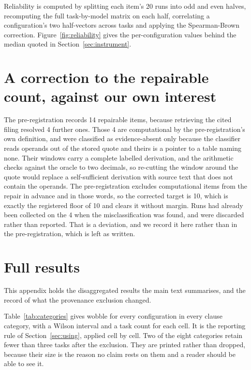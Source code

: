 \documentclass[11pt]{article}
\begin{document}
Reliability is
computed by splitting each item's 20 runs into odd and even halves, recomputing the full
task-by-model matrix on each half, correlating a configuration's two half-vectors across tasks and
applying the Spearman-Brown correction. Figure~\ref{fig:reliability} gives the per-configuration
values behind the median quoted in Section~\ref{sec:instrument}.

\section{A correction to the repairable count, against our own interest}
\label{sec:deviation}

The pre-registration records 14 repairable items, because retrieving the cited filing resolved 4
further ones. Those 4 are computational by the pre-registration's own definition, and were
classified as evidence-absent only because the classifier reads operands out of the stored quote
and theirs is a pointer to a table naming none. Their windows carry a complete labelled
derivation, and the arithmetic checks against the oracle to two decimals, so re-cutting the window
around the quote would replace a self-sufficient derivation with source text that does not contain
the operands. The pre-registration excludes computational items from the repair in advance and in
those words, so the corrected target is 10, which is exactly the registered floor of 10 and clears
it without margin. Runs had already been collected on the 4 when the misclassification was found,
and were discarded rather than reported. That is a deviation, and we record it here rather than in
the pre-registration, which is left as written.

\section{Full results}
\label{sec:appendix}

This appendix holds the disaggregated results the main text summarises, and the record of what the
provenance exclusion changed.

Table~\ref{tab:categories} gives wobble for every configuration in every clause category, with a
Wilson interval and a task count for each cell. It is the reporting rule of
Section~\ref{sec:using}, applied cell by cell. Two of the eight categories retain fewer than three tasks after the
exclusion. They are printed rather than dropped, because their size is the reason no claim rests
on them and a reader should be able to see it.
\end{document}

